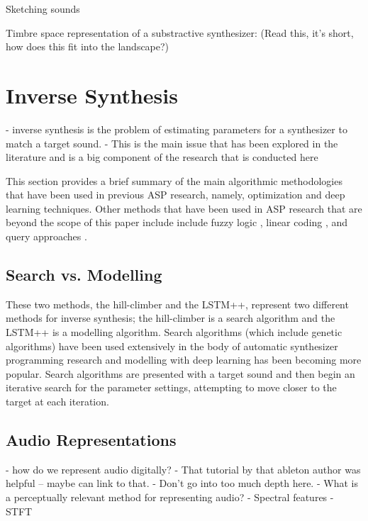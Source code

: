  Sketching sounds \cite{lobbers2021sketching} \cite{knees2016searching}
 
 Timbre space representation of a substractive synthesizer: \cite{vahidi2020timbre} (Read this, it's short, how does this fit into the landscape?)


\section{Inverse Synthesis}
- inverse synthesis is the problem of estimating parameters for a synthesizer to match a target sound.
- This is the main issue that has been explored in the literature and is a big component of the research that is conducted here
 
This section provides a brief summary of the main algorithmic methodologies that have been used in previous ASP research, namely, optimization and deep learning techniques. Other methods that have been used in ASP research that are beyond the scope of this paper include  include fuzzy logic \cite{mitchell2005frequency, hamadicharef2012intelligent}, linear coding \cite{mintz2007toward}, and query approaches \cite{mcartwright2014}.

\subsection{Search vs. Modelling}
These two methods, the hill-climber and the LSTM++, represent two different methods for inverse synthesis; the hill-climber is a search algorithm and the LSTM++ is a modelling algorithm. Search algorithms (which include genetic algorithms) have been used extensively in the body of automatic synthesizer programming research and modelling with deep learning has been becoming more popular. Search algorithms are presented with a target sound and then begin an iterative search for the parameter settings, attempting to move closer to the target at each iteration.

\subsection{Audio Representations}
- how do we represent audio digitally?
- That tutorial by that ableton author was helpful -- maybe can link to that.
- Don't go into too much depth here.
- What is a perceptually relevant method for representing audio?
- Spectral features
- STFT

